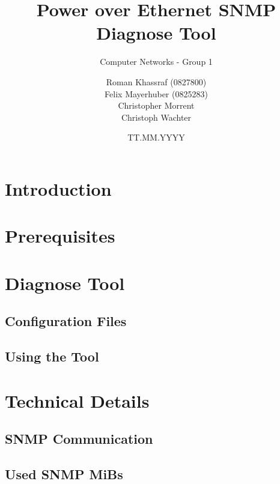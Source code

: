 \documentclass[a4paper, 12pt]{scrartcl}
\title{Power over Ethernet SNMP Diagnose Tool}
\subtitle{Computer Networks - Group 1}
\author{Roman Khassraf (0827800)\\ Felix Mayerhuber (0825283) \\ Christopher Morrent \\ Christoph Wachter }
\date{TT.MM.YYYY}
\begin{document}
\maketitle

\section{Introduction}

\section{Prerequisites}

\section{Diagnose Tool}

\subsection{Configuration Files}

\subsection{Using the Tool}

\section{Technical Details}

\subsection{SNMP Communication}

\subsection{Used SNMP MiBs}
\end{document}
